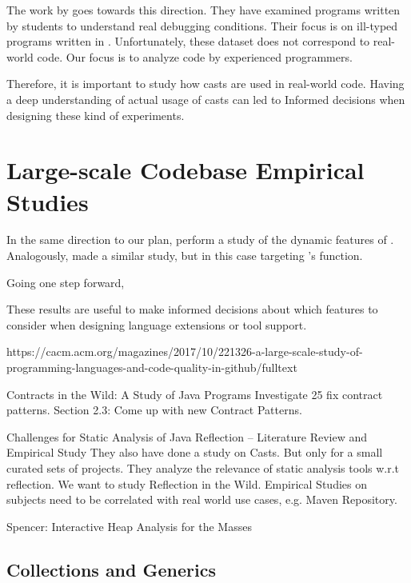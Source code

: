 The work by \cite{Wu:2017:TEF:3152284.3133929,Wu:2017:LUF:3152284.3133930} goes towards this direction.
They have examined programs written by students to understand real debugging conditions.
Their focus is on ill-typed programs written in \haskell{}.
Unfortunately, these dataset does not correspond to real-world code.
Our focus is to analyze code by experienced programmers.

Therefore, it is important to study how casts are used in real-world code.
Having a deep understanding of actual usage of casts can led to
Informed decisions when designing these kind of experiments.

\section{Large-scale Codebase Empirical Studies}

In the same direction to our plan, \cite{Callau:2011:DUD:1985441.1985448} perform a study of the dynamic features of \smalltalk{}.
Analogously, \cite{Richards:2011:EML:2032497.2032503} made a similar study, but in this case targeting \javascript{}'s \eval{} function.

Going one step forward, \cite{Ray:2017:LSP:3144574.3126905} 

These results are useful to make informed decisions about which features to consider when designing language extensions or tool support.

https://cacm.acm.org/magazines/2017/10/221326-a-large-scale-study-of-programming-languages-and-code-quality-in-github/fulltext



Contracts in the Wild: A Study of Java Programs
Investigate 25 fix contract patterns.
Section 2.3: Come up with new Contract Patterns.
\cite{dietrich_et_al:LIPIcs:2017:7259}

\cite{Landman:2017:CSA:3097368.3097429}
Challenges for Static Analysis of Java Reflection -- Literature Review and Empirical Study
They also have done a study on Casts.
But only for a small curated sets of projects.
They analyze the relevance of static analysis tools w.r.t reflection.
We want to study Reflection in the Wild.
Empirical Studies on subjects need to be correlated with real world use cases, e.g. Maven Repository.



Spencer: Interactive Heap Analysis for the Masses
\cite{DBLP:journals/corr/BrandauerW17}


\subsection*{Collections and Generics}

